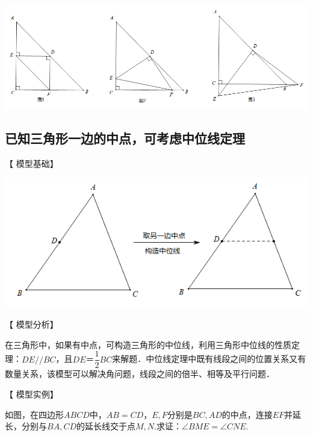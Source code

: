 \documentclass[10pt]{ctexart}
\begin{document}
\begin{flushright}
	\includegraphics[scale=0.6]{figure/zhongdian10}
\end{flushright}

\subsection{已知三角形一边的中点，可考虑中位线定理}

【 {\heiti 模型基础}】

\begin{center}
	\includegraphics[scale=0.6]{figure/zhongdian11}
\end{center}

【 {\heiti 模型分析}】

	在三角形中，如果有中点，可构造三角形的中位线，利用三角形中位线的性质定理：$DE//BC$，且$DE＝ \dfrac{1}{2}BC$来解题．中位线定理中既有线段之间的位置关系又有数量关系，该模型可以解决角问题，线段之间的倍半、相等及平行问题．


【 {\heiti 模型实例}】
\begin{shaded}
如图，在四边形$ABCD$中，$AB=CD$，$E,F$分别是$BC,AD$的中点，连接$EF$并延长，分别与$BA,CD$的延长线交于点$M,N$.求证：$\angle BME=\angle CNE$.
\end{shaded}
\end{document}

